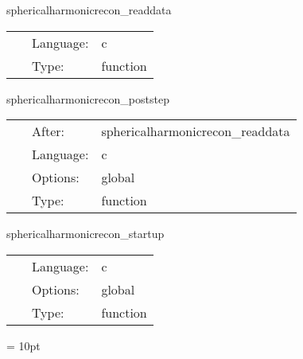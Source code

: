 \vspace{5mm}


\hspace{5mm} sphericalharmonicrecon\_readdata 

\hspace{5mm}{\it read the world tube data and set the data flag to read } 


\hspace{5mm}

 \begin{tabular*}{160mm}{cll} 
~ & Language:  & c \\ 
~ & Type:  & function \\ 
\end{tabular*} 


\vspace{5mm}


\hspace{5mm} sphericalharmonicrecon\_poststep 

\hspace{5mm}{\it set data flag to unread } 


\hspace{5mm}

 \begin{tabular*}{160mm}{cll} 
~ & After:  & sphericalharmonicrecon\_readdata \\ 
~ & Language:  & c \\ 
~ & Options:  & global \\ 
~ & Type:  & function \\ 
\end{tabular*} 


\vspace{5mm}


\hspace{5mm} sphericalharmonicrecon\_startup 

\hspace{5mm}{\it startup } 


\hspace{5mm}

 \begin{tabular*}{160mm}{cll} 
~ & Language:  & c \\ 
~ & Options:  & global \\ 
~ & Type:  & function \\ 
\end{tabular*} 



\vspace{5mm}\parskip = 10pt 

